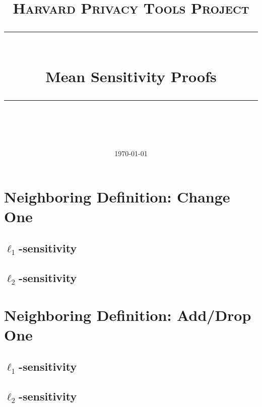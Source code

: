 \documentclass[11pt]{scrartcl} %
\title{
	\normalfont\normalsize
	\textsc{Harvard Privacy Tools Project}\\ %
	\vspace{25pt} %
	\rule{\linewidth}{0.5pt}\\ %
	\vspace{20pt} %
	{\huge Mean Sensitivity Proofs}\\ %
	\vspace{12pt} %
	\rule{\linewidth}{2pt}\\ %
	\vspace{12pt} %
}
\date{\normalsize\today} %
\begin{document}
\section{Neighboring Definition: Change One}
\subsection{$\ell_1$-sensitivity}
\subsection{$\ell_2$-sensitivity}

\section{Neighboring Definition: Add/Drop One}
\subsection{$\ell_1$-sensitivity}
\subsection{$\ell_2$-sensitivity}


\maketitle



\end{document}

